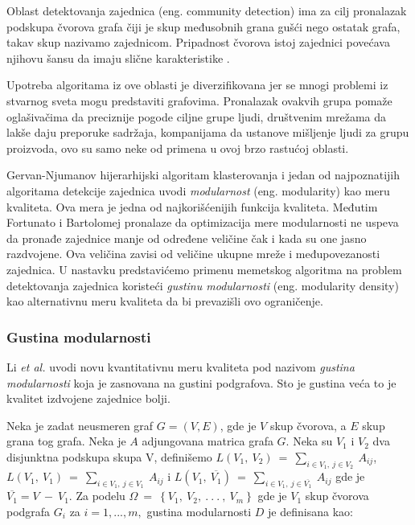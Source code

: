 \documentclass[a4paper]{article}
\begin{document}
Oblast detektovanja zajednica (eng. community detection) ima za cilj pronalazak podskupa čvorova grafa čiji je skup međusobnih grana gušći nego ostatak grafa, takav skup nazivamo zajednicom. Pripadnost čvorova istoj zajednici povećava njihovu šansu da imaju slične karakteristike \cite{gong}.

Upotreba algoritama iz ove oblasti je diverzifikovana jer se mnogi problemi iz stvarnog sveta mogu predstaviti grafovima. Pronalazak ovakvih grupa pomaže oglašivačima da preciznije pogode ciljne grupe ljudi, društvenim mrežama da lakše daju preporuke sadržaja, kompanijama da ustanove mišljenje ljudi za grupu proizvoda, ovo su samo neke od primena u ovoj brzo rastućoj oblasti.

Gervan-Njumanov \cite{newman} hijerarhijski algoritam klasterovanja i jedan od najpoznatijih algoritama detekcije zajednica uvodi \textit{modularnost} (eng. modularity) kao meru kvaliteta. Ova mera je jedna od najkorišćenijih  funkcija kvaliteta. Međutim Fortunato i Bartolomej \cite{fortunato} pronalaze da optimizacija mere modularnosti ne uspeva da pronađe zajednice manje od određene veličine čak i kada su one jasno razdvojene. Ova veličina zavisi od veličine ukupne mreže i međupovezanosti zajednica. U nastavku predstavićemo primenu memetskog algoritma na problem detektovanja zajednica koristeći  \textit{gustinu modularnosti} (eng. modularity density) kao alternativnu meru kvaliteta da bi prevazišli ovo ograničenje.

\subsubsection{Gustina modularnosti}

Li \textit{et al.} \cite{li} uvodi novu kvantitativnu meru kvaliteta pod nazivom \textit{gustina modularnosti} koja je zasnovana na gustini podgrafova. Sto je gustina veća to je kvalitet izdvojene zajednice bolji.

Neka je zadat neusmeren graf $G = (V, E)$, gde je $V$ skup čvorova, a $E$ skup grana tog grafa.
Neka je $A$ adjungovana matrica grafa $G$. Neka su $V_1$ i $V_2$ dva disjunktna podskupa skupa V, definišemo $L\left(V_1,\:V_2\right)\:=\:\sum _{i\in V_1,\:j\in V_2}\:A_{ij}$, 
$L\left(V_1,\:V_1\right)\:=\:\sum _{i\in V_1,\:j\in V_1}\:A_{ij}$ i
$L\left(V_1,\:\overline{V_1}\right)\:=\:\sum _{i\in V_1,\:j\in \overline{V_1}}\:A_{ij}$ gde je  $\overline{V_1}=V\:-\:V_1$. Za podelu $\Omega \:=\:\left\{V_1,\:V_2,\:.\:.\:.\:,\:V_m\right\}$ gde je $V_1$
skup čvorova podgrafa $G_i$ za $i=1, . . ., m,$ gustina modularnosti $D$ je definisana kao:
\end{document}
